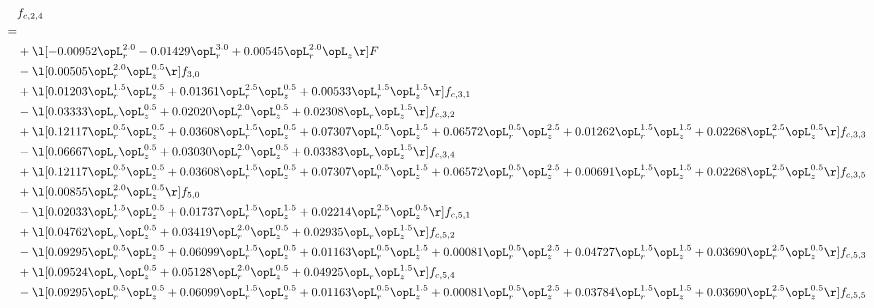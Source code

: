 \begin{alignat}{2} 
\label{eq:f_24_2} 
& f_{c,2,4} \nonumber \\ 
 = \\ 
& + \l[  -0.00952 \opL_r^{2.0}   -0.01429 \opL_r^{3.0} +  0.00545 \opL_r^{2.0} \opL_z  \r] F \nonumber \\ 
& - \l[  0.00505 \opL_r^{2.0} \opL_z^{0.5}  \r] f_{3,0} \nonumber \\ 
& + \l[  0.01203 \opL_r^{1.5} \opL_z^{0.5} +  0.01361 \opL_r^{2.5} \opL_z^{0.5} +  0.00533 \opL_r^{1.5} \opL_z^{1.5}  \r] f_{c,3,1} \nonumber \\ 
& - \l[  0.03333 \opL_r \opL_z^{0.5} +  0.02020 \opL_r^{2.0} \opL_z^{0.5} +  0.02308 \opL_r \opL_z^{1.5}  \r] f_{c,3,2} \nonumber \\ 
& + \l[  0.12117 \opL_r^{0.5} \opL_z^{0.5} +  0.03608 \opL_r^{1.5} \opL_z^{0.5} +  0.07307 \opL_r^{0.5} \opL_z^{1.5} +  0.06572 \opL_r^{0.5} \opL_z^{2.5} +  0.01262 \opL_r^{1.5} \opL_z^{1.5} +  0.02268 \opL_r^{2.5} \opL_z^{0.5}  \r] f_{c,3,3} \nonumber \\ 
& - \l[  0.06667 \opL_r \opL_z^{0.5} +  0.03030 \opL_r^{2.0} \opL_z^{0.5} +  0.03383 \opL_r \opL_z^{1.5}  \r] f_{c,3,4} \nonumber \\ 
& + \l[  0.12117 \opL_r^{0.5} \opL_z^{0.5} +  0.03608 \opL_r^{1.5} \opL_z^{0.5} +  0.07307 \opL_r^{0.5} \opL_z^{1.5} +  0.06572 \opL_r^{0.5} \opL_z^{2.5} +  0.00691 \opL_r^{1.5} \opL_z^{1.5} +  0.02268 \opL_r^{2.5} \opL_z^{0.5}  \r] f_{c,3,5} \nonumber \\ 
& + \l[  0.00855 \opL_r^{2.0} \opL_z^{0.5}  \r] f_{5,0} \nonumber \\ 
& - \l[  0.02033 \opL_r^{1.5} \opL_z^{0.5} +  0.01737 \opL_r^{1.5} \opL_z^{1.5} +  0.02214 \opL_r^{2.5} \opL_z^{0.5}  \r] f_{c,5,1} \nonumber \\ 
& + \l[  0.04762 \opL_r \opL_z^{0.5} +  0.03419 \opL_r^{2.0} \opL_z^{0.5} +  0.02935 \opL_r \opL_z^{1.5}  \r] f_{c,5,2} \nonumber \\ 
& - \l[  0.09295 \opL_r^{0.5} \opL_z^{0.5} +  0.06099 \opL_r^{1.5} \opL_z^{0.5} +  0.01163 \opL_r^{0.5} \opL_z^{1.5} +  0.00081 \opL_r^{0.5} \opL_z^{2.5} +  0.04727 \opL_r^{1.5} \opL_z^{1.5} +  0.03690 \opL_r^{2.5} \opL_z^{0.5}  \r] f_{c,5,3} \nonumber \\ 
& + \l[  0.09524 \opL_r \opL_z^{0.5} +  0.05128 \opL_r^{2.0} \opL_z^{0.5} +  0.04925 \opL_r \opL_z^{1.5}  \r] f_{c,5,4} \nonumber \\ 
& - \l[  0.09295 \opL_r^{0.5} \opL_z^{0.5} +  0.06099 \opL_r^{1.5} \opL_z^{0.5} +  0.01163 \opL_r^{0.5} \opL_z^{1.5} +  0.00081 \opL_r^{0.5} \opL_z^{2.5} +  0.03784 \opL_r^{1.5} \opL_z^{1.5} +  0.03690 \opL_r^{2.5} \opL_z^{0.5}  \r] f_{c,5,5} \nonumber \\ 

\end{alignat}
